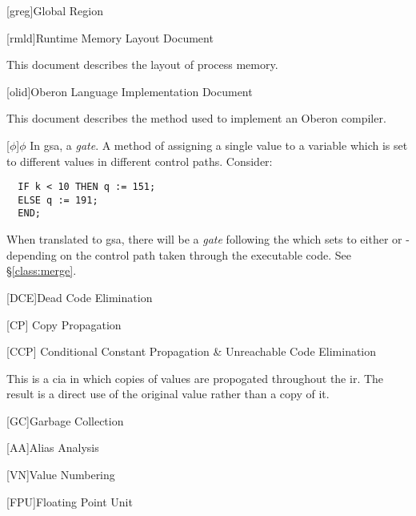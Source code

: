\begin{acronym}
  [greg]{Global Region}

  [rmld]{Runtime Memory Layout Document}

  This document describes the layout of process memory.

  [olid]{Oberon Language Implementation Document}

  This document describes the method used to implement an Oberon compiler.

  [$\phi$]{$\phi$}
  In \ac{gsa}, a \emph{gate}.  A method of assigning a single value to
  a variable which is set to different values in different control
  paths.  Consider:

\begin{verbatim}
  IF k < 10 THEN q := 151;
  ELSE q := 191;
  END;
\end{verbatim}

  When translated to \ac{gsa}, there will be a \emph{gate} following
  the  which sets  to either  or
   - depending on the control path taken through the
  executable code.  See \S\ref{class:merge}.

  [DCE]{Dead Code Elimination}

  [CP] {Copy Propagation}

  [CCP] {Conditional Constant Propagation \& Unreachable
  Code Elimination}
  
  This is a \ac{cia} in which copies of values are propogated
  throughout the \ac{ir}.  The result is a direct use of the original
  value rather than a copy of it.

  [GC]{Garbage Collection}

  [AA]{Alias Analysis}

  [VN]{Value Numbering}

  [FPU]{Floating Point Unit}
\end{acronym}
